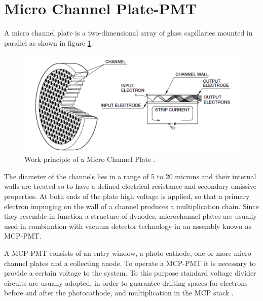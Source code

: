 \section{Micro Channel Plate-PMT}
A micro channel plate is a two-dimensional array of glass capillaries mounted in parallel as shown in figure \ref{fig:MCP_schematics}.
\begin{figure}[htbp]
\begin{center}
\includegraphics[width=12cm]{../Pictures/Chapter_3/MCP_plate.png}
\end{center}
\caption[MCP principle]{Work principle of a Micro Channel Plate \cite{Hama2006}.}
\label{fig:MCP_schematics}
\end{figure}
The diameter of the channels lies in a range of 5 to 20 microns and their internal walls are treated so to have a defined electrical resistance and secondary emissive properties.
At both ends of the plate high voltage is applied, so that a primary electron impinging on the wall of a channel produces a multiplication chain.
Since they resemble in function a structure of dynodes, microchannel plates are usually used in combination with vacuum detector technology in an assembly known as MCP-PMT.

A MCP-PMT consists of an entry window, a photo cathode, one or more micro channel plates and a collecting anode.
To operate a MCP-PMT it is necessary to provide a certain voltage to the system. To this purpose standard voltage divider circuits are usually adopted, in order to guarantee drifting spaces for electrons before and after the photocathode, and multiplication in the MCP stack \cite{Hama2006}.

  
